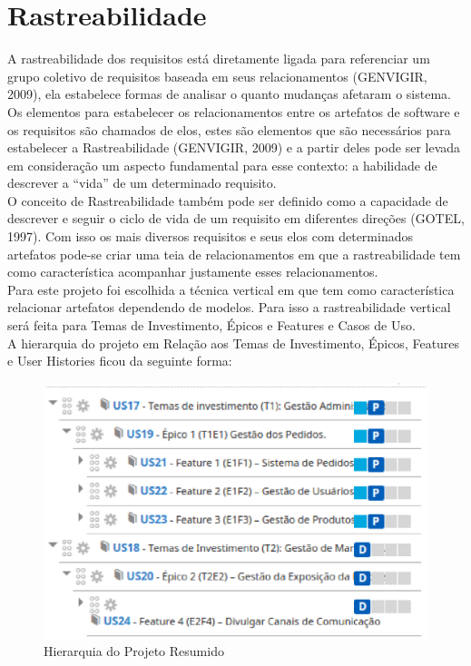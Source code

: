 \section{Rastreabilidade}

A rastreabilidade dos requisitos está diretamente ligada para referenciar um grupo coletivo de requisitos baseada em seus relacionamentos (GENVIGIR, 2009), ela estabelece formas de analisar o quanto mudanças afetaram o sistema.
\tab Os elementos para estabelecer os relacionamentos entre os artefatos de software e os requisitos são chamados de elos, estes são elementos que são necessários para estabelecer a Rastreabilidade (GENVIGIR, 2009) e a partir deles pode ser levada em consideração um aspecto fundamental para esse contexto: a habilidade de descrever a “vida” de um determinado requisito. \\
\tab O conceito de Rastreabilidade também pode ser definido como a capacidade de descrever e seguir o ciclo de vida de um requisito em diferentes direções (GOTEL, 1997). Com isso os mais diversos requisitos e seus elos com determinados artefatos pode-se criar uma teia de relacionamentos em que a rastreabilidade tem como característica acompanhar justamente esses relacionamentos.\\
\tab Para este projeto foi escolhida a técnica vertical em que tem como característica relacionar artefatos dependendo de modelos. Para isso a rastreabilidade vertical será feita para Temas de Investimento, Épicos e Features e Casos de Uso.\\
\tab A hierarquia do projeto em Relação aos Temas de Investimento, Épicos, Features e User Histories ficou da seguinte forma:\\

\begin{figure}[h]
    \centering
    \label{fig01}
        \includegraphics[keepaspectratio=true,scale=0.5]{figuras/RallyDev/hierarquia1.eps}
    \caption{Hierarquia do Projeto Resumido}
\end{figure}

